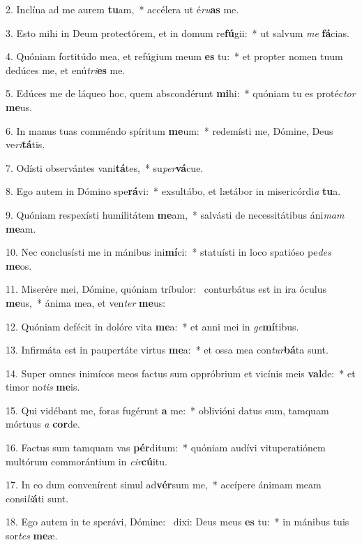 2. Inclína ad me aurem \textbf{tu}am,~*  accélera ut é\textit{ru}\textbf{as} me.\

3. Esto mihi in Deum protectórem, et in domum re\textbf{fú}gii:~*  ut salvum \textit{me} \textbf{fá}cias.\

4. Quóniam fortitúdo mea, et refúgium meum \textbf{es} tu:~*  et propter nomen tuum dedúces me, et enú\textit{tri}\textbf{es} me.\

5. Edúces me de láqueo hoc, quem abscondérunt \textbf{mi}hi:~*  quóniam tu es protéc\textit{tor} \textbf{me}us.\

6. In manus tuas comméndo spíritum \textbf{me}um:~*  redemísti me, Dómine, Deus ve\textit{ri}\textbf{tá}tis.\

7. Odísti observántes vani\textbf{tá}tes,~*  su\textit{per}\textbf{vá}cue.\

8. Ego autem in Dómino spe\textbf{rá}vi:~*  exsultábo, et lætábor in misericórdi\textit{a} \textbf{tu}a.\

9. Quóniam respexísti humilitátem \textbf{me}am,~*  salvásti de necessitátibus áni\textit{mam} \textbf{me}am.\

10. Nec conclusísti me in mánibus ini\textbf{mí}ci:~*  statuísti in loco spatióso pe\textit{des} \textbf{me}os.\

11. Miserére mei, Dómine, quóniam tríbulor: \dag\  conturbátus est in ira óculus \textbf{me}us,~*  ánima mea, et ven\textit{ter} \textbf{me}us:\

12. Quóniam defécit in dolóre vita \textbf{me}a:~*  et anni mei in \textit{ge}\textbf{mí}tibus.\

13. Infirmáta est in paupertáte virtus \textbf{me}a:~*  et ossa mea con\textit{tur}\textbf{bá}ta sunt.\

14. Super omnes inimícos meos factus sum oppróbrium et vicínis meis \textbf{val}de:~*  et timor no\textit{tis} \textbf{me}is.\

15. Qui vidébant me, foras fugérunt \textbf{a} me:~*  oblivióni datus sum, tamquam mórtuus \textit{a} \textbf{cor}de.\

16. Factus sum tamquam vas \textbf{pér}ditum:~*  quóniam audívi vituperatiónem multórum commorántium in \textit{cir}\textbf{cú}itu.\

17. In eo dum convenírent simul ad\textbf{vér}sum me,~*  accípere ánimam meam consi\textit{li}\textbf{á}ti sunt.\

18. Ego autem in te sperávi, Dómine: \dag\  dixi: Deus meus \textbf{es} tu:~*  in mánibus tuis sor\textit{tes} \textbf{me}æ.\

